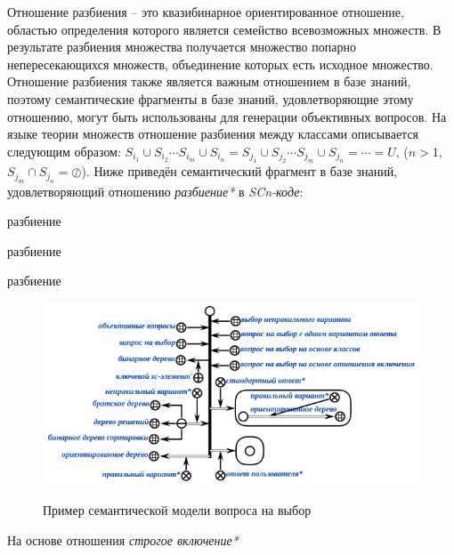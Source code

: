\begin{textitemize}
\begin{textitemize}
		Отношение разбиения – это квазибинарное ориентированное отношение, областью определения которого является семейство всевозможных множеств. В  результате разбиения множества получается множество попарно непересекающихся множеств, объединение которых есть исходное множество. Отношение разбиения также является важным отношением в базе знаний, поэтому семантические фрагменты в базе знаний, удовлетворяющие этому отношению, могут быть использованы для генерации объективных вопросов. На языке теории множеств отношение разбиения между классами описывается следующим образом: $S_{i_{1}}\cup  S_{i_{2}}\cdots S_{i_{m}} \cup S_{i_{n}} = S_{j_{1}}\cup  S_{j_{2}}\cdots S_{j_{m}} \cup S_{j_{n}}= \cdots = U$, ($n>1$, $S_{j_{m}} \cap S_{j_{n}} = \oslash$). Ниже приведён семантический фрагмент в базе знаний, удовлетворяющий отношению \textit{разбиение*} в \textit{SCn-коде}:
		\begin{SCn}
			\begin{scnrelfromset}{разбиение}
			\end{scnrelfromset}
			\begin{scnrelfromset}{разбиение}
			\end{scnrelfromset}
			\begin{scnrelfromset}{разбиение}
			\end{scnrelfromset}
		\end{SCn}
		\begin{figure}[H]
			\caption{Пример семантической модели вопроса на выбор}
			\includegraphics[scale=1]{author/part7/figures/MC_question_example.png}
			\label{fig:mc_example}
		\end{figure}
		
		\item На основе отношения \textit{строгое включение*}
		

\end{textitemize}
\end{textitemize}
